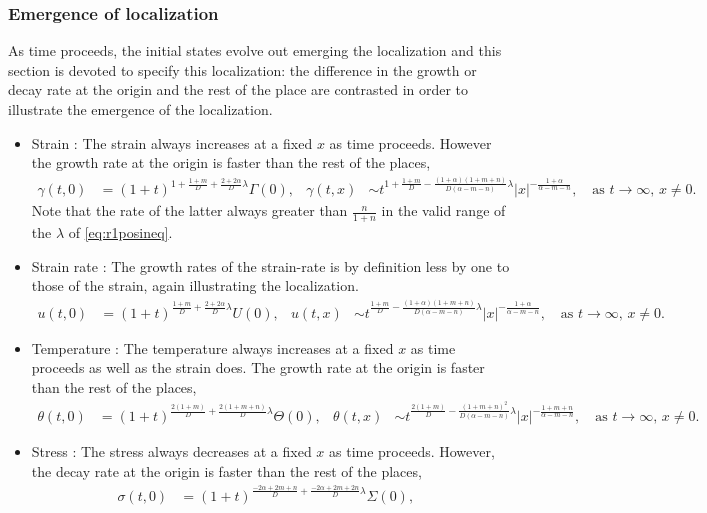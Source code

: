 \documentclass[a4paper,11pt]{article}
\begin{document}
\subsubsection{Emergence of localization}
As time proceeds, the initial states evolve out emerging the localization and this section is devoted to specify this localization: the difference in the growth or decay rate at the origin and the rest of the place are contrasted in order to illustrate the emergence of the localization. 
\begin{itemize}
 \item Strain : The strain always increases at a fixed $x$ as time proceeds. However the growth rate at the origin is faster than the rest of the places,
\begin{align*}
 \gamma(t,0) &= (1+t)^{1+\frac{1+m}{D} + \frac{2+2\alpha}{D}\lambda}\Gamma(0), &
 \gamma(t,x) &\sim t^{1+\frac{1+m}{D} - \frac{(1+\alpha)(1+m+n)}{D(\alpha-m-n)}\lambda}|x|^{-\frac{1+\alpha}{\alpha-m-n}}, \quad \text{as $t \rightarrow \infty$, $x\ne0$.}
\end{align*}
Note that the rate of the latter always greater than $\frac{n}{1+n}$ in the valid range of the $\lambda$ of \eqref{eq:r1posineq}.
\item Strain rate : The growth rates of the strain-rate is by definition less by one to those of the strain, again illustrating the localization.
\begin{align*}
 u(t,0) &= (1+t)^{\frac{1+m}{D} + \frac{2+2\alpha}{D}\lambda}U(0),&
 u(t,x) &\sim t^{\frac{1+m}{D} - \frac{(1+\alpha)(1+m+n)}{D(\alpha-m-n)}\lambda}|x|^{-\frac{1+\alpha}{\alpha-m-n}}, \quad \text{as $t \rightarrow \infty$, $x\ne0$.}
\end{align*}
\item Temperature : The temperature always increases at a fixed $x$ as time proceeds as well as the strain does. The growth rate at the origin is faster than the rest of the places,
\begin{align*}
 \theta(t,0) &= (1+t)^{\frac{2(1+m)}{D} + \frac{2(1+m+n)}{D}\lambda}\Theta(0),&
 \theta(t,x) &\sim t^{\frac{2(1+m)}{D} - \frac{(1+m+n)^2}{D(\alpha-m-n)}\lambda}|x|^{-\frac{1+m+n}{\alpha-m-n}}, \quad \text{as $t \rightarrow \infty$, $x\ne0$.}
\end{align*}
\item Stress : The stress always decreases at a fixed $x$ as time proceeds. However, the decay rate at the origin is faster than the rest of the places,
\begin{align*}
 \sigma(t,0) &= (1+t)^{\frac{-2\alpha+2m+n}{D} + \frac{-2\alpha+2m+2n}{D}\lambda}\Sigma(0), &

\end{align*}
\end{itemize}
\end{document}
